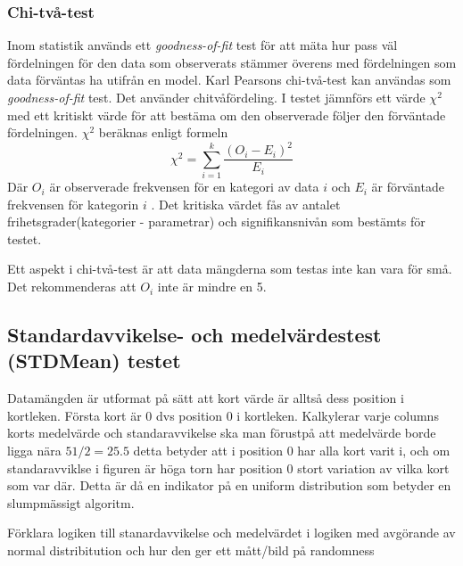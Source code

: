 \documentclass[swedish,a4paper]{article}
\begin{document}
\begin{equation*}
\end{equation*}

\subsubsection{Chi-två-test}
\label{sec:chi_square}
Inom statistik används ett \textit{goodness-of-fit} test för att mäta
hur pass väl fördelningen för den data som observerats stämmer överens
med fördelningen som data förväntas ha utifrån en model. Karl Pearsons
chi-två-test kan användas som \textit{goodness-of-fit} test. Det
använder chitvåfördeling. I testet jämnförs ett värde $\chi^2$ med ett
kritiskt värde för att bestäma om den observerade följer den förväntade
fördelningen. $\chi^2$ beräknas enligt formeln
$$\chi^2 = \sum_{i=1}^k\frac{(O_i - E_i)^2}{E_i}$$
Där $O_i$ är observerade frekvensen för en kategori av data $i$ och $E_i$
är förväntade frekvensen för kategorin $i$ \parencite{nist}.
Det kritiska värdet fås av antalet frihetsgrader(kategorier - parametrar)
och signifikansnivån som bestämts för testet.

Ett aspekt i chi-två-test är att data mängderna som testas inte kan vara för
små. Det rekommenderas att $O_i$ inte är mindre en 5.

\subsection{Standardavvikelse- och medelvärdestest (STDMean) testet}
\label{sec:stdmean}
Datamängden är utformat på sätt att kort värde är alltså dess position i
kortleken. Första kort är 0 dvs position 0 i kortleken. Kalkylerar varje
columns korts medelvärde och standaravvikelse ska man förustpå att medelvärde
borde ligga nära $51/2= 25.5$ detta betyder att i position 0 har alla kort varit
i, och om standaravviklse i figuren är höga torn har position 0 stort variation
av vilka kort som var där. Detta är då en indikator på en uniform distribution
som betyder en slumpmässigt algoritm.

Förklara logiken till stanardavvikelse och medelvärdet
i logiken med avgörande av normal distribitution och hur den ger ett mått/bild på randomness
\end{document}
